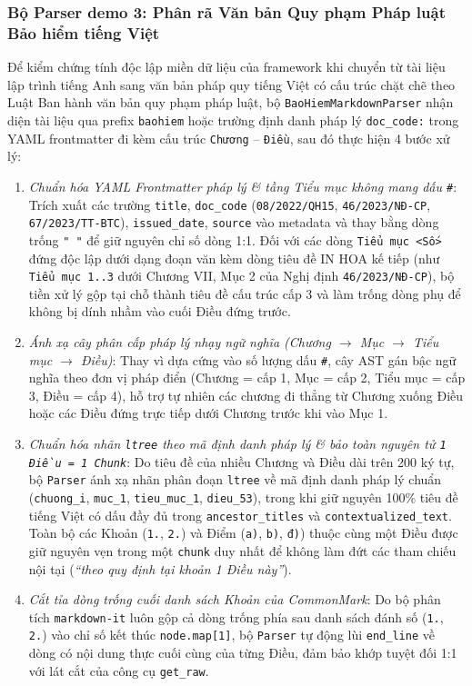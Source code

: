 \subsubsection{Bộ Parser demo 3: Phân rã Văn bản Quy phạm Pháp luật Bảo hiểm tiếng Việt}
Để kiểm chứng tính độc lập miền dữ liệu của framework khi chuyển từ tài liệu lập trình tiếng Anh sang văn bản pháp quy tiếng Việt có cấu trúc chặt chẽ theo Luật Ban hành văn bản quy phạm pháp luật, bộ \texttt{BaoHiemMarkdownParser} nhận diện tài liệu qua prefix \texttt{baohiem} hoặc trường định danh pháp lý \texttt{doc\_code:} trong YAML frontmatter đi kèm cấu trúc \texttt{Chương} -- \texttt{Điều}, sau đó thực hiện 4 bước xử lý:
\begin{enumerate}
    \item \textit{Chuẩn hóa YAML Frontmatter pháp lý \& tầng Tiểu mục không mang dấu \texttt{\#}}: Trích xuất các trường \texttt{title}, \texttt{doc\_\allowbreak code} (\texttt{08/2022/\allowbreak QH15}, \texttt{46/2023/\allowbreak NĐ-CP}, \texttt{67/2023/\allowbreak TT-BTC}), \texttt{issued\_\allowbreak date}, \texttt{source} vào metadata và thay bằng dòng trống \texttt{" "} để giữ nguyên chỉ số dòng 1:1. Đối với các dòng \texttt{Tiểu mục <Số>} đứng độc lập dưới dạng đoạn văn kèm dòng tiêu đề IN HOA kế tiếp (như \texttt{Tiểu mục 1..3} dưới Chương VII, Mục 2 của Nghị định \texttt{46/2023/NĐ-CP}), bộ tiền xử lý gộp tại chỗ thành tiêu đề cấu trúc cấp 3 và làm trống dòng phụ để không bị dính nhầm vào cuối Điều đứng trước.
    \item \textit{Ánh xạ cây phân cấp pháp lý nhạy ngữ nghĩa (Chương $\to$ Mục $\to$ Tiểu mục $\to$ Điều)}: Thay vì dựa cứng vào số lượng dấu \texttt{\#}, cây AST gán bậc ngữ nghĩa theo đơn vị pháp điển (Chương = cấp 1, Mục = cấp 2, Tiểu mục = cấp 3, Điều = cấp 4), hỗ trợ tự nhiên các chương đi thẳng từ Chương xuống Điều hoặc các Điều đứng trực tiếp dưới Chương trước khi vào Mục 1.
    \item \textit{Chuẩn hóa nhãn \texttt{ltree} theo mã định danh pháp lý \& bảo toàn nguyên tử \texttt{1 Điều = 1 Chunk}}: Do tiêu đề của nhiều Chương và Điều dài trên 200 ký tự, bộ \texttt{Parser} ánh xạ nhãn phân đoạn \texttt{ltree} về mã định danh pháp lý chuẩn (\texttt{chuong\_i}, \texttt{muc\_1}, \texttt{tieu\_muc\_1}, \texttt{dieu\_53}), trong khi giữ nguyên 100\% tiêu đề tiếng Việt có dấu đầy đủ trong \texttt{ancestor\_\allowbreak titles} và \texttt{contextualized\_\allowbreak text}. Toàn bộ các Khoản (\texttt{1.}, \texttt{2.}) và Điểm (\texttt{a)}, \texttt{b)}, \texttt{đ)}) thuộc cùng một Điều được giữ nguyên vẹn trong một \texttt{chunk} duy nhất để không làm đứt các tham chiếu nội tại (\textit{``theo quy định tại khoản 1 Điều này''}).
    \item \textit{Cắt tỉa dòng trống cuối danh sách Khoản của CommonMark}: Do bộ phân tích \texttt{markdown-it} luôn gộp cả dòng trống phía sau danh sách đánh số (\texttt{1.}, \texttt{2.}) vào chỉ số kết thúc \texttt{node.map[1]}, bộ \texttt{Parser} tự động lùi \texttt{end\_line} về dòng có nội dung thực cuối cùng của từng Điều, đảm bảo khớp tuyệt đối 1:1 với lát cắt của công cụ \texttt{get\_raw}.
\end{enumerate}

